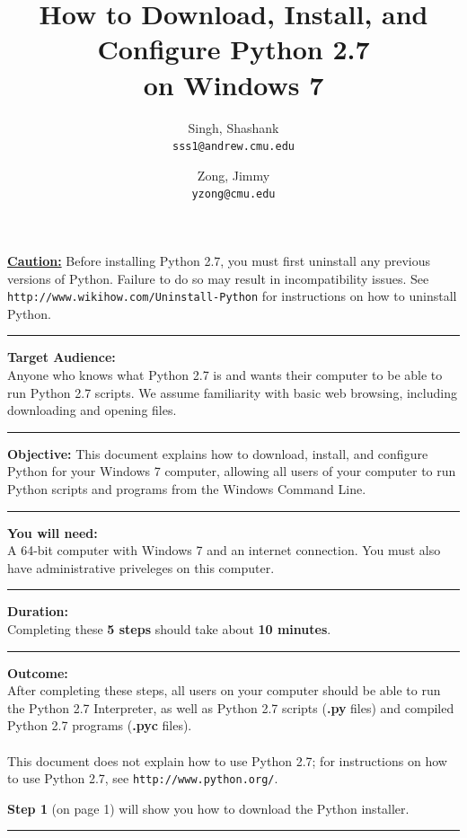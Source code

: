 \documentclass[11pt,english]{article}
\title{How to Download, Install, and Configure Python 2.7\\ on Windows 7}
\author{
  Singh, Shashank \\
  \texttt{sss1@andrew.cmu.edu}
  \and
  Zong, Jimmy\\
  \texttt{yzong@cmu.edu}
}
\newcommand{\myhrule}{\vspace{0.3cm}\hrule\vspace{0.3cm}}
\begin{document}
\begin{titlepage}
\maketitle
\vfill
{\bf \color{red} \underline{Caution:}} Before installing Python 2.7, you must
first uninstall any previous versions of Python. Failure to do so may result in
incompatibility issues. See \texttt{http://www.wikihow.com/Uninstall-Python}
for instructions on how to uninstall Python.
\myhrule
{\bf Target Audience:}\\
Anyone who knows what Python 2.7 is and wants their computer to be able to run
Python 2.7 scripts. We assume familiarity with basic web browsing, including
downloading and opening files.
\myhrule
{\bf Objective:} This document explains how to download, install, and
configure Python for your Windows 7 computer, allowing all users of your
computer to run Python scripts and programs from the Windows Command Line.
\myhrule
{\bf You will need:}\\
A 64-bit computer with Windows 7 and an internet connection. You must also have
administrative priveleges on this computer.
\myhrule
{\bf Duration:}\\
Completing these {\bf 5 steps} should take about {\bf 10 minutes}.
\myhrule
{\bf Outcome:}\\
After completing these steps, all users on your computer should be able to run
the Python 2.7 Interpreter, as well as Python 2.7 scripts ({\bf .py} files) and
compiled Python 2.7 programs ({\bf .pyc} files).\\\\
This document does not explain how to use Python 2.7; for instructions on how
to use Python 2.7, see \texttt{http://www.python.org/}.
\vspace{2cm}

{\bf Step 1} (on page 1) will show you how to download the Python
installer.
\myhrule
\end{titlepage}
\end{document}
